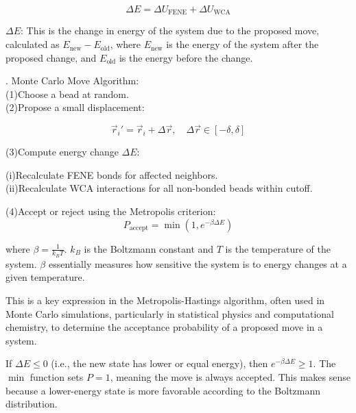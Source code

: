 \documentclass[12pt]{article}
\begin{document}
\begin{flushleft}
\begin{equation}
\Delta E = \Delta U_{\text{FENE}} + \Delta U_{\text{WCA}}
\end{equation}



\textbf{$\Delta E$}: This is the change in energy of the system due to the proposed move, calculated as $E_{\text{new}} - E_{\text{old}}$, where $E_{\text{new}}$ is the energy of the system after the proposed change, and $E_{\text{old}}$ is the energy before the change.


. Monte Carlo Move Algorithm:\\ 

\setlength{\parindent}{6em}(1)Choose a bead at random.\\
(2)Propose a small displacement:
    
\begin{equation}
    \vec{r}_i' = \vec{r}_i + \Delta \vec{r}, \quad \Delta \vec{r} \in [-\delta, \delta] 
\end{equation}

  
\setlength{\parindent}{6em}(3)Compute energy change $\Delta E$:
\setlength{\parindent}{0pt} 

\setlength{\parindent}{100pt}(i)Recalculate FENE bonds for affected neighbors.\\
(ii)Recalculate WCA interactions for all non-bonded beads within cutoff.\\
\setlength{\parindent}{0pt}


\setlength{\parindent}{6em}(4)Accept or reject using the Metropolis criterion:
\setlength{\parindent}{0pt}
\begin{equation}
P_{\text{accept}} = \min \left(1, e^{-\beta \Delta E}\right)
\end{equation}

where $\beta = \frac{1}{k_B T}$. $k_B$ is the Boltzmann constant and $T$ is the temperature of the system. $\beta$ essentially measures how sensitive the system is to energy changes at a given temperature.

\setlength{\parindent}{30pt}

This is a key expression in the Metropolis-Hastings algorithm, often used in Monte Carlo simulations, particularly in statistical physics and computational chemistry, to determine the acceptance probability of a proposed move in a system.




If $\Delta E \leq 0$ (i.e., the new state has lower or equal energy), then $e^{-\beta \Delta E} \geq 1$. The $\min$ function sets $P = 1$, meaning the move is always accepted. This makes sense because a lower-energy state is more favorable according to the Boltzmann distribution.


\end{flushleft}
\end{document}
